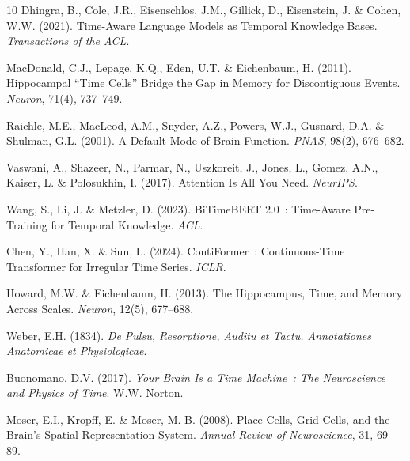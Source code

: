 \documentclass[10pt,twocolumn,letterpaper]{article}
\begin{document}
\begin{thebibliography}{10}
 Dhingra, B., Cole, J.R., Eisenschlos, J.M., Gillick, D., Eisenstein, J. \& Cohen, W.W. (2021). Time-Aware Language Models as Temporal Knowledge Bases. \emph{Transactions of the ACL}.

 MacDonald, C.J., Lepage, K.Q., Eden, U.T. \& Eichenbaum, H. (2011). Hippocampal ``Time Cells'' Bridge the Gap in Memory for Discontiguous Events. \emph{Neuron}, 71(4), 737--749.

 Raichle, M.E., MacLeod, A.M., Snyder, A.Z., Powers, W.J., Gusnard, D.A. \& Shulman, G.L. (2001). A Default Mode of Brain Function. \emph{PNAS}, 98(2), 676--682.

 Vaswani, A., Shazeer, N., Parmar, N., Uszkoreit, J., Jones, L., Gomez, A.N., Kaiser, L. \& Polosukhin, I. (2017). Attention Is All You Need. \emph{NeurIPS}.

 Wang, S., Li, J. \& Metzler, D. (2023). BiTimeBERT 2.0~: Time-Aware Pre-Training for Temporal Knowledge. \emph{ACL}.

 Chen, Y., Han, X. \& Sun, L. (2024). ContiFormer~: Continuous-Time Transformer for Irregular Time Series. \emph{ICLR}.

 Howard, M.W. \& Eichenbaum, H. (2013). The Hippocampus, Time, and Memory Across Scales. \emph{Neuron}, 12(5), 677--688.

 Weber, E.H. (1834). \emph{De Pulsu, Resorptione, Auditu et Tactu. Annotationes Anatomicae et Physiologicae}.

 Buonomano, D.V. (2017). \emph{Your Brain Is a Time Machine~: The Neuroscience and Physics of Time}. W.W. Norton.

 Moser, E.I., Kropff, E. \& Moser, M.-B. (2008). Place Cells, Grid Cells, and the Brain's Spatial Representation System. \emph{Annual Review of Neuroscience}, 31, 69--89.
\end{thebibliography}
\end{document}
